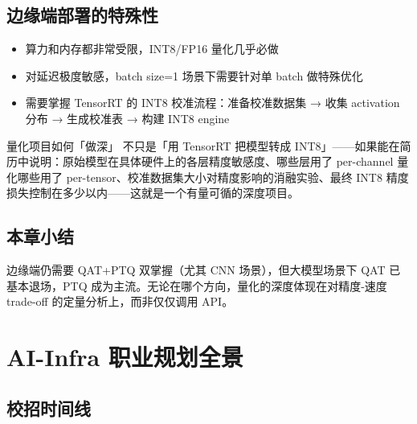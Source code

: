 \documentclass[a4paper]{article}
\begin{document}
\subsection{边缘端部署的特殊性}

\begin{itemize}
    \item 算力和内存都非常受限，INT8/FP16 量化几乎必做
    \item 对延迟极度敏感，batch size=1 场景下需要针对单 batch 做特殊优化
    \item 需要掌握 TensorRT 的 INT8 校准流程：准备校准数据集 → 收集 activation 分布 → 生成校准表 → 构建 INT8 engine
\end{itemize}

\begin{knowledgebox}{量化项目如何「做深」}
不只是「用 TensorRT 把模型转成 INT8」——如果能在简历中说明：原始模型在具体硬件上的各层精度敏感度、哪些层用了 per-channel 量化哪些用了 per-tensor、校准数据集大小对精度影响的消融实验、最终 INT8 精度损失控制在多少以内——这就是一个有量可循的深度项目。
\end{knowledgebox}

\subsection{本章小结}
边缘端仍需要 QAT+PTQ 双掌握（尤其 CNN 场景），但大模型场景下 QAT 已基本退场，PTQ 成为主流。无论在哪个方向，量化的深度体现在对精度-速度 trade-off 的定量分析上，而非仅仅调用 API。

\section{AI-Infra 职业规划全景}

\subsection{校招时间线}
\end{document}
